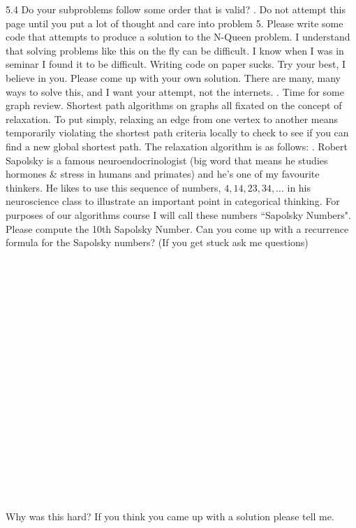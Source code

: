 \documentclass[12pt]{article}
\begin{document}
5.4 Do your subproblems follow some order that is valid?
\newpage
{}. Do not attempt this page until you put a 
lot of thought and care into problem 5. Please write
some code that attempts to produce a solution to the
N-Queen problem.
 I understand that solving problems like this on the 
 fly can be difficult. I know when I was in seminar 
 I found it to be difficult. Writing code on paper sucks.
  Try your best, I believe in you. Please come up with your
  own solution. There are many, many ways to solve this,
  and I want your attempt, not the internets.
\newpage
{}. Time for some graph review. Shortest path algorithms on graphs all fixated 
on the concept of relaxation. To put simply, relaxing an edge from
one vertex to another means temporarily violating the shortest path
criteria locally to check to see if you can find a new global shortest path.
The relaxation algorithm is as follows:
\newpage
{}. Robert Sapolsky is a famous neuroendocrinologist (big word that means he studies hormones \& stress in humans and primates) and he's one of my favourite thinkers. He likes to use this sequence of numbers, $4, 14, 23, 34, \dots$ in his neuroscience class to illustrate an important point in categorical thinking. For purposes of our algorithms course I will call these numbers ``Sapolsky Numbers". Please compute the 10th Sapolsky Number. Can you come up with a recurrence formula for the Sapolsky numbers? (If you get stuck ask me questions)\\\\\\\\\\\\\\\\\\\\\\\\\\\\\\\\\\\\\\\\
Why was this hard? If you think you came up with a solution please tell me. 
\end{document}
